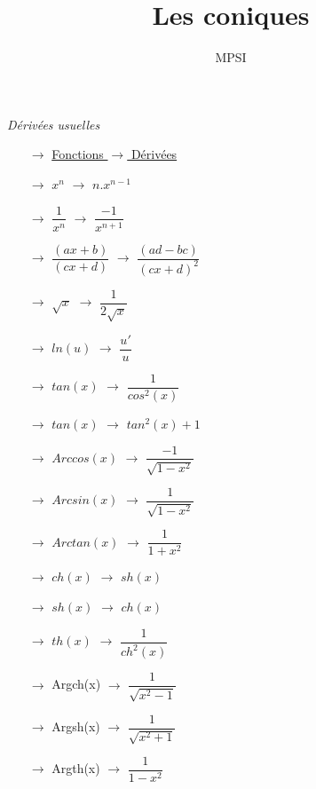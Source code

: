 \documentclass[a4paper,12pt,oneside]{report}
\title{Les coniques}
\author{MPSI}
\begin{document}
\begin{center}
 \begin{LARGE} \textit{Dérivées usuelles} \end{LARGE}
\end{center}

\begin{itemize}
 \item[$\rightarrow$] \underline{Fonctions  $\rightarrow$ Dérivées} \\
 \item[$\rightarrow$] $x^n$ $\rightarrow$ $n.x^{n-1}$\\
\item[$\rightarrow$] $\dfrac{1}{x^n}$ $\rightarrow$ $\dfrac{-1}{x^{n+1}}$\\
\item[$\rightarrow$] $\dfrac{(ax+b)}{(cx+d)}$ $\rightarrow$ $\dfrac{(ad-bc)}{(cx+d)^2}$\\
\item[$\rightarrow$] $\sqrt{x}$ $\rightarrow$ $\dfrac{1}{2\sqrt{x}}$\\
\item[$\rightarrow$] $ln(u)$ $\rightarrow$ $\dfrac{u'}{u}$\\
\item[$\rightarrow$] $tan(x)$ $\rightarrow$ $\dfrac{1}{cos^2(x)}$\\
\item[$\rightarrow$] $tan(x)$ $\rightarrow$ $tan^2(x)+1$\\
\item[$\rightarrow$] $Arccos(x)$ $\rightarrow$ $\dfrac{-1}{\sqrt{1-x^2}}$\\
\item[$\rightarrow$] $Arcsin(x)$ $\rightarrow$ $\dfrac{1}{\sqrt{1-x^2}}$\\
\item[$\rightarrow$] $Arctan(x)$ $\rightarrow$ $\dfrac{1}{1+x^2}$\\
\item[$\rightarrow$] $ch(x)$ $\rightarrow$ $sh(x)$\\
\item[$\rightarrow$] $sh(x)$ $\rightarrow$ $ch(x)$\\
\item[$\rightarrow$] $th(x)$ $\rightarrow$ $\dfrac{1}{ch^2(x)}$\\
\item[$\rightarrow$] Argch(x) $\rightarrow$ $\dfrac{1}{\sqrt{x^2-1}}$\\
\item[$\rightarrow$] Argsh(x) $\rightarrow$ $\dfrac{1}{\sqrt{x^2+1}}$\\
\item[$\rightarrow$] Argth(x) $\rightarrow$ $\dfrac{1}{1-x^2}$\\
\end{itemize}
\end{document}
